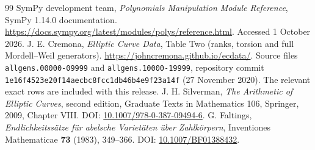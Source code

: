 \documentclass[11pt,letterpaper]{article}
\theoremstyle{definition}\newtheorem{definition}[theorem]{Definition}
\theoremstyle{remark}\newtheorem{remark}[theorem]{Remark}
\begin{document}
\begin{thebibliography}{99}
 SymPy development team, \emph{Polynomials Manipulation Module Reference}, SymPy 1.14.0 documentation. \url{https://docs.sympy.org/latest/modules/polys/reference.html}. Accessed 1 October 2026.
 J. E. Cremona, \emph{Elliptic Curve Data}, Table Two (ranks, torsion and full Mordell--Weil generators). \url{https://johncremona.github.io/ecdata/}. Source files \texttt{allgens.00000-09999} and \texttt{allgens.10000-19999}, repository commit \texttt{1e16f4523e20f14aecbc8fcc1db46b4e9f23a14f} (27 November 2020). The relevant exact rows are included with this release.
 J. H. Silverman, \emph{The Arithmetic of Elliptic Curves}, second edition, Graduate Texts in Mathematics 106, Springer, 2009, Chapter VIII. DOI: \href{https://doi.org/10.1007/978-0-387-09494-6}{10.1007/978-0-387-09494-6}.
 G. Faltings, \emph{Endlichkeitss\"atze f\"ur abelsche Variet\"aten \"uber Zahlk\"orpern}, Inventiones Mathematicae \textbf{73} (1983), 349--366. DOI: \href{https://doi.org/10.1007/BF01388432}{10.1007/BF01388432}.
\end{thebibliography}
\end{document}
